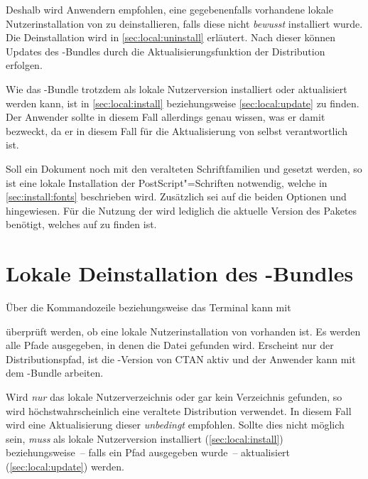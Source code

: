 Deshalb wird Anwendern empfohlen, eine gegebenenfalls vorhandene lokale 
Nutzerinstallation von \TUDScript zu deinstallieren, falls diese nicht 
\emph{bewusst} installiert wurde. Die Deinstallation wird in 
\autoref{sec:local:uninstall} erläutert. Nach dieser können Updates des 
\TUDScript-Bundles durch die Aktualisierungsfunktion der Distribution erfolgen. 

Wie das \TUDScript-Bundle trotzdem als lokale Nutzerversion installiert oder 
aktualisiert werden kann, ist in \autoref{sec:local:install} beziehungsweise 
\autoref{sec:local:update} zu finden. Der Anwender sollte in diesem Fall 
allerdings genau wissen, was er damit bezweckt, da er in diesem Fall für die 
Aktualisierung von \TUDScript selbst verantwortlich ist.

Soll ein Dokument noch mit den veralteten Schriftfamilien \Univers und \DIN 
gesetzt werden, so ist eine lokale Installation der PostScript"=Schriften 
notwendig, welche in \autoref{sec:install:fonts} beschrieben wird. Zusätzlich 
sei auf die beiden Optionen  und  
hingewiesen. Für die Nutzung der \OpenSans wird lediglich die aktuelle Version 
des Paketes  benötigt, welches auf  zu 
finden ist.


\section{Lokale Deinstallation des \TUDScript-Bundles}
%
%
%
Über die Kommandozeile beziehungsweise das Terminal kann mit
%
\begin{quoting}
\end{quoting}
%
überprüft werden, ob eine lokale Nutzerinstallation von \TUDScript vorhanden 
ist. Es werden alle Pfade ausgegeben, in denen die Datei  
gefunden wird. Erscheint nur der Distributionspfad, ist die \TUDScript-Version 
von CTAN aktiv und der Anwender kann mit dem \TUDScript-Bundle arbeiten.

Wird \emph{nur} das lokale Nutzerverzeichnis oder gar kein Verzeichnis 
gefunden, so wird höchstwahrscheinlich eine veraltete Distribution 
verwendet. In diesem Fall wird eine Aktualisierung dieser \emph{unbedingt} 
empfohlen. Sollte dies nicht möglich sein, \emph{muss} \TUDScript als lokale 
Nutzerversion installiert (\autoref{sec:local:install}) beziehungsweise~-- 
falls ein Pfad ausgegeben wurde~-- aktualisiert (\autoref{sec:local:update}) 
werden.

